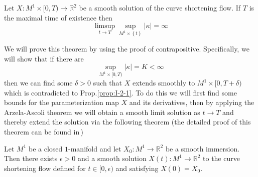 \begin{theorem}\label{thm:I-1-2}
    Let $X:M^1\times[0,T)\to\mathbb{R}^2$ be a smooth solution of the curve shortening flow. If $T$ is the maximal time of existence then
    \begin{equation}
        \limsup_{t\to T}\sup_{M^1\times\left\{t\right\}}\left|\kappa\right|=\infty
    \end{equation}
\end{theorem}

We will prove this theorem by using the proof of contrapositive. Specifically, we will show that if there are
\begin{equation*}
    \sup_{M^1\times[0,T)}\left|\kappa\right|=K<\infty
\end{equation*}
then we can find some $\delta>0$ such that $X$ extends smoothly to $M^1\times[0,T+\delta)$ which is contradicted to Prop.\ref{prop:I-2-1}. To do this we will first find some bounds for the parameterization map $X$ and its derivatives, then by applying the Arzela-Ascoli theorem we will obtain a smooth limit solution as $t\to T$ and thereby extend the solution via the following theorem (the detailed proof of this theorem can be found in\,\cite{shorttimeexistence})
\begin{theorem}\label{thm:short time existence}
    Let $M^1$ be a closed $1$-manifold and let $X_0:M^1\to\mathbb{R}^2$ be a smooth immersion. Then there exists $\epsilon>0$ and a smooth solution $X(t):M^1\to\mathbb{R}^2$ to the curve shortening flow defined for $t\in[0,\epsilon)$ and satisfying $X(0)=X_0$.
\end{theorem}

